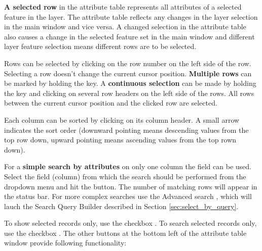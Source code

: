 \textbf{A selected row} in the attribute table represents all attributes of a 
selected feature in the layer. The attribute table reflects any changes 
in the layer selection in the main window and vice versa. A changed selection 
in the attribute table also causes a change in the selected feature set in the 
main window and different layer feature selection means different rows are to be 
selected.

Rows can be selected by clicking on the row number on the left side of the 
row. Selecting a row doesn't change the current cursor position. \textbf{Multiple 
rows} can be marked by holding the  key. A \textbf{continuous 
selection} can be made by holding the  key and clicking on several 
row headers on the left side of the rows. All rows between the current cursor 
position and the clicked row are selected.

Each column can be sorted by clicking on its column header. A small arrow 
indicates the sort order (downward pointing means descending values from the top 
row down, upward pointing means ascending values from the top rown down).
 
For a \textbf{simple search by attributes} on only one column the  
field can be used. Select the field (column) from which the search should be 
performed from the dropdown menu and hit the  button. The number of 
matching rows will appear in the status bar. For more complex searches use 
the Advanced search , which will lauch the Search Query Builder 
described in Section \ref{sec:select_by_query}.  

To show selected records only, use the checkbox . To search selected records only, use the checkbox . The other buttons at the bottom left of the attribute table window provide following functionality: 

